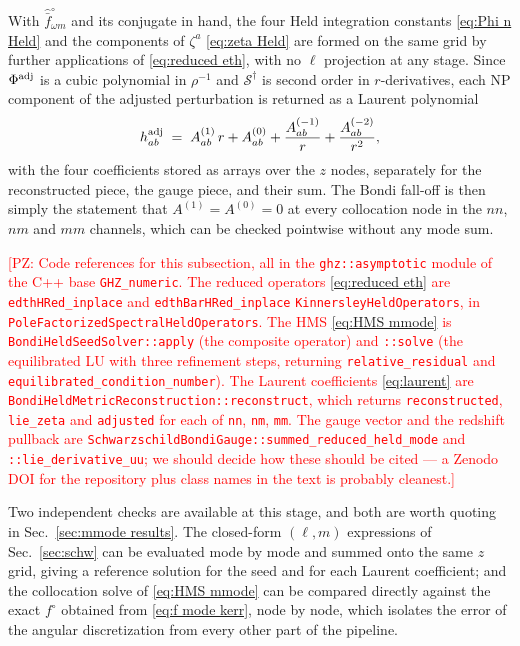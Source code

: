 \documentclass[%
reprint,
 prd,
superscriptaddress,
nofootinbib,
aps,
dvipsnames
]{revtex4-2}
\newcommand{\PZ}[1]{\textcolor{red}{\textsf{[PZ: #1]}}}
\newcommand{\emm}{m}
\renewcommand{\S}{{\mathcal S}}
\def\fHo{f^{\circ}}
\def\Phiadj{\Phi^{\rm adj}}
\begin{document}
With $\hat{\bar f}^{\circ}_{\omega\emm}$ and its conjugate in hand, the four
Held integration constants \eqref{eq:Phi n Held} and the components of
$\zeta^{a}$ \eqref{eq:zeta Held} are formed on the same grid by further
applications of \eqref{eq:reduced eth}, with no $\ell$ projection at any
stage. Since $\Phiadj$ is a cubic polynomial in $\rho^{-1}$ and
$\S^{\dagger}$ is second order in $r$-derivatives, each NP component of the
adjusted perturbation is returned as a Laurent polynomial
\begin{equation}\label{eq:laurent}
  h^{\rm adj}_{ab} \;=\; A^{(1)}_{ab}\,r + A^{(0)}_{ab}
  + \frac{A^{(-1)}_{ab}}{r} + \frac{A^{(-2)}_{ab}}{r^{2}},
\end{equation}
with the four coefficients stored as arrays over the $z$ nodes, separately
for the reconstructed piece, the gauge piece, and their sum. The Bondi
fall-off is then simply the statement that $A^{(1)}=A^{(0)}=0$ at every
collocation node in the $nn$, $nm$ and $mm$ channels, which can be checked
pointwise without any mode sum.

\PZ{Code references for this subsection, all in the \texttt{ghz::asymptotic}
module of the C++ base \texttt{GHZ\_numeric}.  The reduced operators
\eqref{eq:reduced eth} are \texttt{edthHRed\_inplace} and
\texttt{edthBarHRed\_inplace}  \texttt{KinnersleyHeldOperators}, in
\texttt{PoleFactorized\-Spectral\-Held\-Operators}.  The HMS
\eqref{eq:HMS mmode} is \texttt{BondiHeldSeedSolver::apply} (the composite
operator) and \texttt{::solve} (the equilibrated LU with three refinement
steps, returning \texttt{relative\_residual} and
\texttt{equilibrated\_condition\_number}).  The Laurent coefficients
\eqref{eq:laurent} are \texttt{BondiHeldMetricReconstruction::reconstruct},
which returns \texttt{reconstructed}, \texttt{lie\_zeta} and
\texttt{adjusted} for each of \texttt{nn}, \texttt{nm}, \texttt{mm}.  The
gauge vector and the redshift pullback are
\texttt{SchwarzschildBondiGauge::summed\_reduced\_held\_mode} and
\texttt{::lie\_derivative\_uu};  we should decide how these should be cited --- a
Zenodo DOI for the repository plus class names in the text is probably
cleanest.}

Two independent checks are available at this stage, and both are worth
quoting in Sec.~\ref{sec:mmode results}. The closed-form $(\ell,m)$
expressions of Sec.~\ref{sec:schw} can be evaluated mode by mode and summed
onto the same $z$ grid, giving a reference solution for the seed and for each
Laurent coefficient; and the collocation solve of \eqref{eq:HMS mmode} can be
compared directly against the exact $\fHo$ obtained from
\eqref{eq:f mode kerr}, node by node, which isolates the error of the angular
discretization from every other part of the pipeline.
\end{document}
